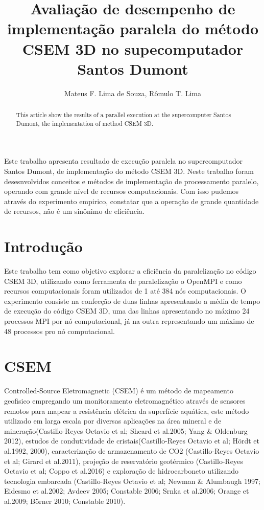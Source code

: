 \documentclass[12pt]{article}
\title{Avaliação de desempenho de implementação paralela do método CSEM 3D no supecomputador Santos Dumont}
\author{Mateus F. Lima de Souza\inst{1,2}, Rômulo T. Lima\inst{1,3}}
\begin{document}
 

\maketitle

\begin{abstract}
  This article show the results of a parallel execution at the supercomputer Santos Dumont, the implementation of method CSEM 3D.
\end{abstract}
     
\begin{resumo} 
  Este trabalho apresenta resultado de execução paralela no supercomputador Santos Dumont, de implementação do método CSEM 3D. Neste trabalho foram desesnvolvidos conceitos e métodos de implementação de processamento paralelo, operando com grande nível de recursos computacionais. Com isso pudemos através do experimento empirico, constatar que a operação de grande quantidade de recursos, não é um sinônimo de eficiência.
\end{resumo}

\section{Introdução}
Este trabalho tem como objetivo explorar a eficiência da paralelização no código CSEM 3D, utilizando como ferramenta de paralelização o OpenMPI e como recursos computacionais foram utilizados de 1 até 384 nós computacionais. O experimento consiste na confecção de duas linhas apresentando a média de tempo de execução do código CSEM 3D, uma das linhas apresentando no máximo 24 processos MPI por nó computacional, já na outra representando um máximo de 48 processos pro nó computacional.

\section{CSEM} \label{sec:firstpage}
Controlled-Source Eletromagnetic (CSEM) é um método de mapeamento geofisico empregando um monitoramento eletromagnético através de sensores remotos para mapear a resistência elétrica da superfície aquática, este método utilizado em larga escala por diversas aplicações na área mineral e de mineração(Castillo-Reyes
Octavio et al; Sheard et al.2005; Yang \& Oldenburg 2012), estudos de condutividade de cristais(Castillo-Reyes
Octavio et al; Hördt et al.1992, 2000), caracterização de armazenamento de CO2 (Castillo-Reyes
Octavio et al; Girard et al.2011), projeção de reservatório geotérmico (Castillo-Reyes
Octavio et al; Coppo et al.2016) e exploração de hidrocarboneto utilizando tecnologia embarcada (Castillo-Reyes
Octavio et al; Newman \& Alumbaugh 1997; Eidesmo et al.2002; Avdeev 2005; Constable 2006; Srnka et al.2006; Orange et al.2009; Börner 2010; Constable 2010). 
\end{document}
